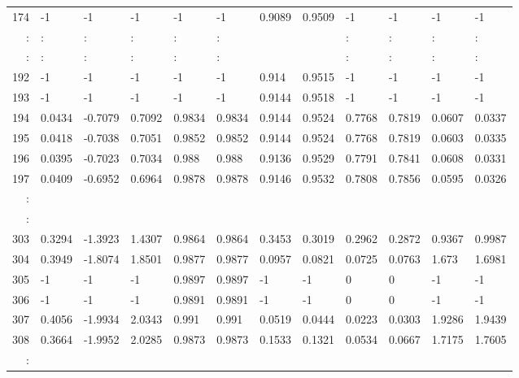 \begin{table}[p]
{\begin{minipage}{\textheight}
\begin{tabular}{r|lll|ll|llll|ll}
174    & -1      & -1      & -1     & -1     & -1     & 0.9089 & 0.9509 & -1     & -1     & -1     & -1     \\
: & :        & :        & :       & :       & :       &        &        & :       & :       & :       & :       \\
\hline
: & :        & :        & :       & :       & :       &        &        & :       & :       & :       & :       \\
192    & -1      & -1      & -1     & -1     & -1     & 0.914  & 0.9515 & -1     & -1     & -1     & -1     \\
193    & -1      & -1      & -1     & -1     & -1     & 0.9144 & 0.9518 & -1     & -1     & -1     & -1     \\
194    & 0.0434  & -0.7079 & 0.7092 & 0.9834 & 0.9834 & 0.9144 & 0.9524 & 0.7768 & 0.7819 & 0.0607 & 0.0337 \\
195    & 0.0418  & -0.7038 & 0.7051 & 0.9852 & 0.9852 & 0.9144 & 0.9524 & 0.7768 & 0.7819 & 0.0603 & 0.0335 \\
196    & 0.0395  & -0.7023 & 0.7034 & 0.988  & 0.988  & 0.9136 & 0.9529 & 0.7791 & 0.7841 & 0.0608 & 0.0331 \\
197    & 0.0409  & -0.6952 & 0.6964 & 0.9878 & 0.9878 & 0.9146 & 0.9532 & 0.7808 & 0.7856 & 0.0595 & 0.0326 \\
: &         &         &        &        &        &        &        &        &        &        &        \\
\hline
: &         &         &        &        &        &        &        &        &        &        &        \\
303    & 0.3294  & -1.3923 & 1.4307 & 0.9864 & 0.9864 & 0.3453 & 0.3019 & 0.2962 & 0.2872 & 0.9367 & 0.9987 \\
304    & 0.3949  & -1.8074 & 1.8501 & 0.9877 & 0.9877 & 0.0957 & 0.0821 & 0.0725 & 0.0763 & 1.673  & 1.6981 \\
305    & -1      & -1      & -1     & 0.9897 & 0.9897 & -1     & -1     & 0      & 0      & -1     & -1     \\
306    & -1      & -1      & -1     & 0.9891 & 0.9891 & -1     & -1     & 0      & 0      & -1     & -1     \\
307    & 0.4056  & -1.9934 & 2.0343 & 0.991  & 0.991  & 0.0519 & 0.0444 & 0.0223 & 0.0303 & 1.9286 & 1.9439 \\
308    & 0.3664  & -1.9952 & 2.0285 & 0.9873 & 0.9873 & 0.1533 & 0.1321 & 0.0534 & 0.0667 & 1.7175 & 1.7605 \\
: &         &         &        &        &        &        &        &        &        &        &        \\

\end{tabular}
\end{minipage}}
\end{table}
